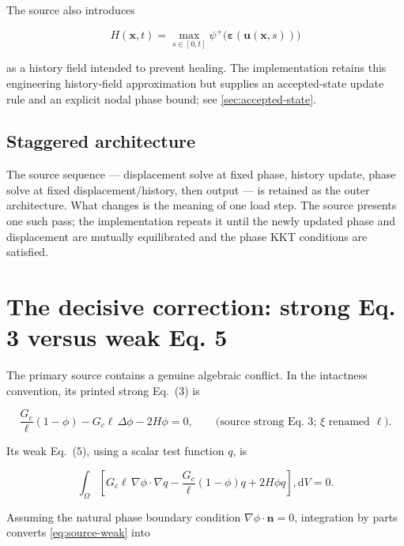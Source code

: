 \documentclass[11pt,a4paper]{article}
\begin{document}
The source also introduces

\begin{equation}
  H(\boldsymbol{x},t)
  =\max_{s\in[0,t]}\psi^+
     \bigl(\boldsymbol{\varepsilon}(\boldsymbol{u}(\boldsymbol{x},s))\bigr)
  \label{eq:history-source}
\end{equation}

as a history field intended to prevent healing. The implementation retains this
engineering history-field approximation but supplies an accepted-state update
rule and an explicit nodal phase bound; see \cref{sec:accepted-state}.

\subsection{Staggered architecture}

The source sequence --- displacement solve at fixed phase, history update,
phase solve at fixed displacement/history, then output --- is retained as the
outer architecture. What changes is the meaning of one load step. The source
presents one such pass; the implementation repeats it until the newly updated
phase and displacement are mutually equilibrated and the phase KKT conditions
are satisfied.

\section{The decisive correction: strong Eq. 3 versus weak Eq. 5}
\label{sec:sign-correction}

The primary source contains a genuine algebraic conflict. In the intactness
convention, its printed strong Eq.~(3) is

\begin{equation}
  \frac{G_c}{\ell}(1-\phi)
  -G_c\ell\,\Delta\phi
  -2H\phi=0,
  \qquad\text{(source strong Eq. 3; $\xi$ renamed $\ell$).}
  \label{eq:source-strong}
\end{equation}

Its weak Eq.~(5), using a scalar test function $q$, is

\begin{equation}
  \int_\Omega
  \left[
    G_c\ell\,\nabla\phi\!\cdot\nabla q
    -\frac{G_c}{\ell}(1-\phi)q
    +2H\phi q
  \right],\mathrm{d}V=0.
  \label{eq:source-weak}
\end{equation}

Assuming the natural phase boundary condition
$\nabla\phi\cdot\boldsymbol{n}=0$, integration by parts converts
\cref{eq:source-weak} into
\end{document}
